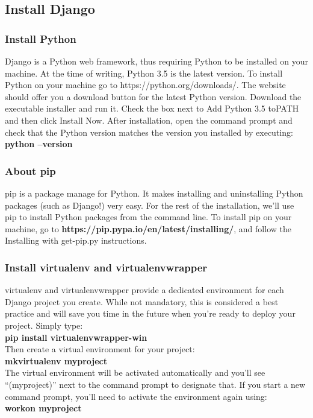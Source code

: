 \documentclass[11pt]{article}
\begin{document}
\begin{multicols}{2}
\subsection{Install Django}
\subsubsection{Install Python}
Django is a Python web framework, thus requiring Python to be installed on your machine. At the time of writing, Python 3.5 is the latest version.
To install Python on your machine go to https://python.org/downloads/. The website should offer you a download button for the latest Python version. Download the executable installer and run it. Check the box next to Add Python 3.5 toPATH and then click Install Now.
After installation, open the command prompt and check that the Python version matches the version you installed by executing:
\\	\textbf{python --version}
\subsubsection{About pip}
pip is a package manage for Python. It makes installing and uninstalling Python packages (such as Django!) very easy. For the rest of the installation, we’ll use pip to install Python packages from the command line.
To install pip on your machine, go to \textbf{https://pip.pypa.io/en/latest/installing/}, and follow the Installing with get-pip.py instructions.
\subsubsection{Install virtualenv and virtualenvwrapper}
virtualenv and virtualenvwrapper provide a dedicated environment for each Django project you create. While not mandatory, this is considered a best practice and will save you time in the future when you’re ready to deploy your project. Simply type:
\\	\textbf{pip install virtualenvwrapper-win}
\\Then create a virtual environment for your project:
\\	\textbf{mkvirtualenv myproject}
\\The virtual environment will be activated automatically and you’ll see “(myproject)” next to the command prompt to designate that. If you start a new command prompt, you’ll need to activate the environment again using:
\\	\textbf{workon myproject}

\end{multicols}
\end{document}

